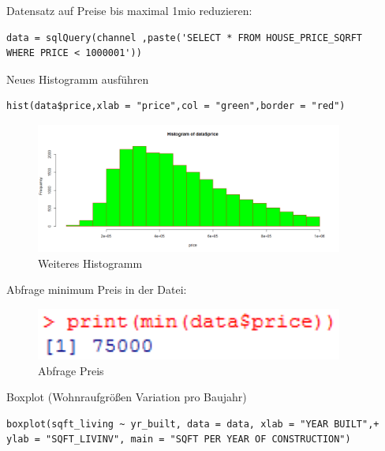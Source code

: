 Datensatz auf Preise bis maximal 1mio reduzieren:
\begin{lstlisting}
data = sqlQuery(channel ,paste('SELECT * FROM HOUSE_PRICE_SQRFT                 WHERE PRICE < 1000001'))
\end{lstlisting}

        Neues Histogramm ausführen
\begin{lstlisting}
hist(data$price,xlab = "price",col = "green",border = "red")
\end{lstlisting}

\begin{figure}[!htb]
        \begin{minipage}{1\textwidth}
                \centering
                \includegraphics[width=0.90\textwidth]{pics/rjdbc4.png}\par\vspace{0cm}
                \caption{Weiteres Histogramm}
                \label{fig:rjdbc4}
        \end{minipage}
\end{figure}

Abfrage minimum Preis in der Datei:
\begin{figure}[!htb]
        \begin{minipage}{1\textwidth}
                \centering
                \includegraphics[width=0.90\textwidth]{pics/rjdbc4-1.png}\par\vspace{0cm}
                \caption{Abfrage Preis}
                \label{fig:rjdbc4-1}
        \end{minipage}
\end{figure}

Boxplot (Wohnraufgrößen Variation pro Baujahr)
\begin{lstlisting}
boxplot(sqft_living ~ yr_built, data = data, xlab = "YEAR BUILT",+    ylab = "SQFT_LIVINV", main = "SQFT PER YEAR OF CONSTRUCTION")
\end{lstlisting}

